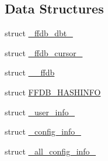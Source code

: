 \subsection*{Data Structures}
\begin{DoxyCompactItemize}
\item 
struct \mbox{\hyperlink{struct__ffdb__dbt__}{\+\_\+ffdb\+\_\+dbt\+\_\+}}
\item 
struct \mbox{\hyperlink{struct__ffdb__cursor__}{\+\_\+ffdb\+\_\+cursor\+\_\+}}
\item 
struct \mbox{\hyperlink{struct____ffdb}{\+\_\+\+\_\+ffdb}}
\item 
struct \mbox{\hyperlink{structFFDB__HASHINFO}{F\+F\+D\+B\+\_\+\+H\+A\+S\+H\+I\+N\+FO}}
\item 
struct \mbox{\hyperlink{struct__user__info__}{\+\_\+user\+\_\+info\+\_\+}}
\item 
struct \mbox{\hyperlink{struct__config__info__}{\+\_\+config\+\_\+info\+\_\+}}
\item 
struct \mbox{\hyperlink{struct__all__config__info__}{\+\_\+all\+\_\+config\+\_\+info\+\_\+}}
\end{DoxyCompactItemize}
